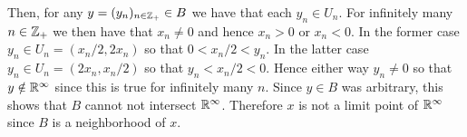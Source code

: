 {{    Then, for any $y = (y_n)_{n \in {{\mathbb{Z}}_+}} \in B$ we have that each $y_n \in U_n$.
    For infinitely many $n \in {{\mathbb{Z}}_+}$ we then have that $x_n \neq 0$ and hence $x_n > 0$ or $x_n < 0$.
    In the former case $y_n \in U_n = (x_n/2, 2x_n)$ so that $0 < x_n/2 < y_n$.
    In the latter case $y_n \in U_n = (2x_n, x_n/2)$ so that $y_n < x_n / 2 < 0$.
    Hence either way $y_n \neq 0$ so that $y \notin {\mathbb{R}}^\infty$ since this is true for infinitely many $n$.
    Since $y \in B$ was arbitrary, this shows that $B$ cannot not intersect ${\mathbb{R}}^\infty$.
    Therefore $x$ is not a limit point of ${\mathbb{R}}^\infty$ since $B$ is a neighborhood of $x$.
  }
}

